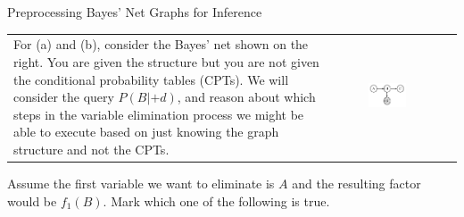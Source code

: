 \begin{problem}[]{Preprocessing Bayes' Net Graphs for Inference}

\begin{tabular}{ll}
\begin{minipage}{0.7\textwidth}
For (a) and (b), consider the Bayes' net shown on the right.  You are given
the structure but you are not given the
conditional probability tables (CPTs).  We will consider the query $P(B|+d)$,
and reason about which steps in the variable elimination process we might be able
to execute based on just knowing the graph structure and not the CPTs.
\end{minipage}
&
\begin{minipage}{0.25\textwidth}
\begin{figure}[H]
\centering
    \includegraphics[width=0.8\textwidth]{figures/FA12-MT2-Elimination3V1.pdf}
\end{figure}
\end{minipage}
\\
\end{tabular}
\begin{question}[2]
Assume the first variable we want to eliminate is $A$ and the
resulting factor would be $f_1(B)$. Mark which one of the following is true.
\begin{multicols}{3}
\begin{itemize}[label=, itemsep=12pt, topsep=12pt]
\TwoA
\end{itemize}
\end{multicols}
\end{question}


\end{problem}
